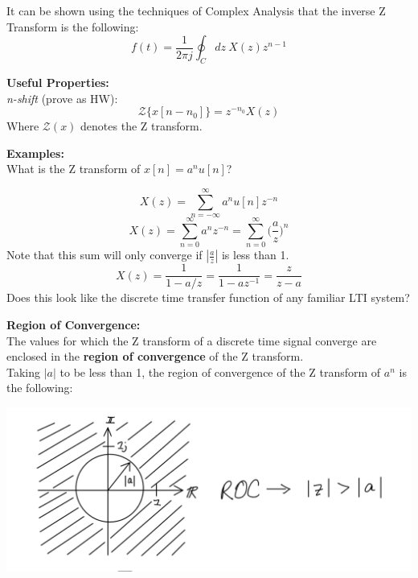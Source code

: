 \documentclass[a4paper]{article}
\numberwithin{equation}{section}
\begin{document}
It can be shown using the techniques of Complex Analysis that the inverse Z Transform is the following:
\begin{equation}\boxed{
f(t) = \frac{1}{2\pi j}\oint_{C} dz\: X(z) z^{n-1}}
\end{equation}

\textbf{Useful Properties:}\\

\textit{n-shift} (prove as HW):
\begin{equation}
\mathcal{Z}\{x[n-n_0]\}=z^{-n_0} X(z)
\end{equation}
Where $\mathcal{Z}(x)$ denotes the Z transform.

\textbf{Examples:}\\
What is the Z transform of $x[n]=a^{n}u[n]$?

\begin{equation}
X(z)=\sum_{n=-\infty}^{\infty} a^{n}u[n] z^{-n}
\end{equation}
\begin{equation}
X(z)=\sum_{n=0}^{\infty} a^{n}z^{-n}=\sum_{n=0}^{\infty} \Big(\frac{a}{z}\Big)^{n}
\end{equation}
Note that this sum will only converge if $|\frac{a}{z}|$ is less than 1.
\begin{equation}
X(z)=\frac{1}{1-a/z}=\frac{1}{1-az^{-1}}=\frac{z}{z-a}
\end{equation}
Does this look like the discrete time transfer function of any familiar LTI system?

\textbf{Region of Convergence:}\\
The values for which the Z transform of a discrete time signal converge are enclosed in the \textbf{region of convergence} of the Z transform. \\

Taking $|a|$ to be less than 1, the region of convergence of the Z transform of $a^{n}$ is the following:

\begin{center}
\includegraphics[scale=0.65]{Z_convergence.png}
\end{center}
\end{document}
